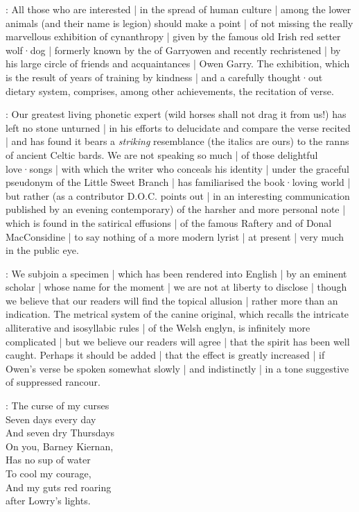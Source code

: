 :
All those who are interested |
in the spread of human culture |
among the lower animals
(and their name is legion)
should make a point |
of not missing the really marvellous exhibition of cynanthropy |
given by the famous old Irish red setter wolf·dog |
formerly known by the  of Garryowen
and recently rechristened |
by his large circle of friends and acquaintances |
Owen Garry.
The exhibition,
which is the result
of years of training by kindness |
and a carefully thought·out dietary system,
comprises,
among other achievements,
the recitation of verse.

:
Our greatest living phonetic expert
(wild horses shall not drag it from us!)
has left no stone unturned |
in his efforts to delucidate and compare the verse recited |
and has found it bears a \emph{striking} resemblance
(the italics are ours)
to the ranns of ancient Celtic bards.
We are not speaking so much |
of those delightful love·songs |
with which the writer who conceals his identity |
under the graceful pseudonym of the Little Sweet Branch |
has familiarised the book·loving world |
but rather
(as a contributor D.O.C. points out |
in an interesting communication published by an evening contemporary)
of the harsher and more personal note |
which is found in the satirical effusions |
of the famous Raftery
and of Donal MacConsidine |
to say nothing of a more modern lyrist |
at present |
very much in the public eye.%

:
We subjoin a specimen |
which has been rendered into English |
by an eminent scholar |
whose name for the moment |
we are not at liberty to disclose |
though we believe that our readers will find the topical allusion |
rather more than an indication.
The metrical system of the canine original,
which recalls the intricate alliterative and isosyllabic rules |
of the Welsh englyn,
is infinitely more complicated |
but we believe our readers will agree |
that the spirit has been well caught.
Perhaps it should be added |
that the effect is greatly increased |
if Owen's verse be spoken somewhat slowly |
and indistinctly |
in a tone suggestive of suppressed rancour.

\garryowen:
    The curse of my curses%
 \\
    Seven days every day\\
    And seven dry Thursdays\\
    On you, Barney Kiernan,\\
    Has no sup of water\\
    To cool my courage,\\
    And my guts red roaring\\
    after Lowry's lights.

